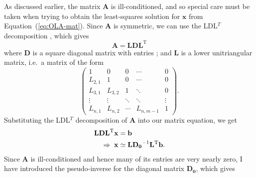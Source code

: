 As discussed earlier, the matrix $\mathbf{A}$ is ill-conditioned, and so special care must be taken when trying to obtain the least-squares solution for $\mathbf{x}$ from Equation~(\ref{eq:OLA-mat}). 
Since $\mathbf{A}$ is symmetric, we can use the LDL$^T$ decomposition \citep[e.g.,][]{banerjee2014linear}, which gives 
\begin{equation}
    \mathbf{A} = \mathbf{LDL}^{\text{T}}
\end{equation}
where $\mathbf{D}$ is a square diagonal matrix with entries ; and $\mathbf{L}$ is a lower unitriangular matrix, i.e.\ a matrix of the form %
\begin{equation} \label{eq:lower-diag}
    \begin{pmatrix}
        1       &   0     & 0      & \cdots & 0 \\[3mm]
        L_{2,1} &   1     & 0      & \cdots & 0 \\[3mm]
        L_{3,1} & L_{3,2} & 1      & \ddots & 0 \\[3mm]
        \vdots  & \vdots  & \ddots & \ddots & \vdots \\[3mm]
        L_{n,1} & L_{n,2} & \cdots & L_{n,m-1} & 1
    \end{pmatrix}.
\end{equation}
Substituting the LDL$^T$ decomposition of $\mathbf A$ into our matrix equation, we get
\begin{align}
    \mathbf{LDL}^{\text{T}} \mathbf{x} &= \mathbf{b} \notag\\
    \Rightarrow\; \mathbf{x} &\simeq \mathbf{LD_0}^{-1}\mathbf{L}^{\text{T}}\mathbf{b}.
\end{align}
Since $\mathbf{A}$ is ill-conditioned and hence many of its entries are very nearly zero, I have introduced the pseudo-inverse for the diagonal matrix $\mathbf{D_0}$, which gives 
